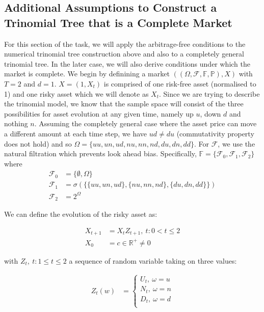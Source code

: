 \documentclass{article}
\begin{document}
\subsection{Additional Assumptions to Construct a Trinomial Tree that is a Complete Market}
For this section of the task, we will apply the arbitrage-free conditions to the numerical trinomial tree construction above and also to a completely general trinomial tree. In the later case, we will also derive conditions under which the market is complete. We begin by definining a market $((\Omega, \mathcal{F},\mathbb{F},\mathbb{P}),X)$ with $T=2$ and $d=1$. $X = (1,X_t)$ is comprised of one risk-free asset (normalised to 1) and one risky asset which we will denote as $X_t$. Since we are trying to describe the trinomial model, we know that the sample space will consist of the three possibilities for asset evolution at any given time, namely up $u$, down $d$ and nothing $n$. Assuming the completely general case where the asset price can move a different amount at each time step, we have $ud\neq du$ (commutativity property does not hold) and so $\Omega = \{uu,un,ud,nu,nn,nd,du,dn,dd\}$. For $\mathcal{F}$, we use the natural filtration which prevents look ahead bias. Specifically, $\mathbb{F} = \{\mathcal{F}_0, \mathcal{F}_1, \mathcal{F}_2\}$ where
\begin{align*}
    \mathcal{F}_0 &= \{\emptyset,\Omega\} \\
    \mathcal{F}_1 &= \sigma(\{\{uu,un,ud\},\{nu,nn,nd\},\{du,dn,dd\}\}) \\
    \mathcal{F}_2 &= 2^\Omega
\end{align*}

We can define the evolution of the risky asset as:

\begin{align*}
    X_{t+1} &= X_tZ_{t+1},\medspace t:0< t\le 2\\
    X_0 & = c\in\mathbb{R}^+\neq0
\end{align*}

with $Z_t,\medspace t:1\le t\le 2$ a sequence of random variable taking on three values:

\begin{align*}
Z_t(w) &= \begin{cases}
    U_t, \medspace \omega=u \\
    N_t, \medspace \omega=n \\
    D_t, \medspace \omega=d \\
\end{cases}
\end{align*}
\end{document}
